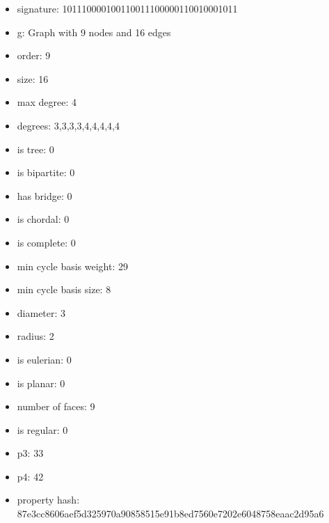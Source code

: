\newpage
\begin{figure}
\end{figure}
\begin{itemize}
\item signature: 101110000100110011100000110010001011
\item g: Graph with 9 nodes and 16 edges
\item order: 9
\item size: 16
\item max degree: 4
\item degrees: 3,3,3,3,4,4,4,4,4
\item is tree: 0
\item is bipartite: 0
\item has bridge: 0
\item is chordal: 0
\item is complete: 0
\item min cycle basis weight: 29
\item min cycle basis size: 8
\item diameter: 3
\item radius: 2
\item is eulerian: 0
\item is planar: 0
\item number of faces: 9
\item is regular: 0
\item p3: 33
\item p4: 42
\item property hash: 87e3cc8606aef5d325970a90858515e91b8ed7560e7202e6048758eaac2d95a6
\end{itemize}
